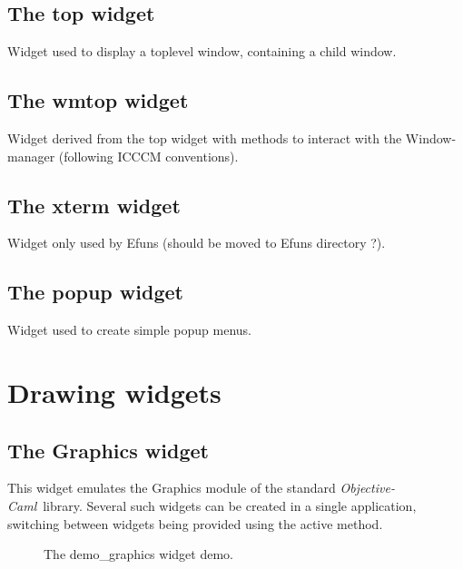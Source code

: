 \documentclass{report}
\newcommand{\ocaml}{\emph{Objective-Caml}~}
\newcommand{\psfigure}[3]{ %
  \begin{quote}\let\normalsize\small\caption{#3\label{fig:#2}}\end{quote}
  }
\begin{document}
\subsection{The {\sf top} widget}

Widget used to display a toplevel window, containing a child window.

\subsection{The {\sf wmtop} widget}

Widget derived from the {\sf top} widget with methods to interact with the 
Window-manager (following ICCCM conventions). 

\subsection{The {\sf xterm} widget}

Widget only used by Efuns (should be moved to Efuns directory ?).

\subsection{The {\sf popup} widget}

Widget used to create simple popup menus.

\section{Drawing widgets}

\subsection{The {\sf Graphics} widget}

This widget emulates the Graphics module of the standard \ocaml library.
Several such widgets can be created in a single application, switching 
between widgets being provided using the {\sf active} method.

\begin{figure}[t]
\begin{center}
\psfigure{0.7}{graphics}{The demo\_graphics widget demo.}
\end{center}
\end{figure}
\end{document}
